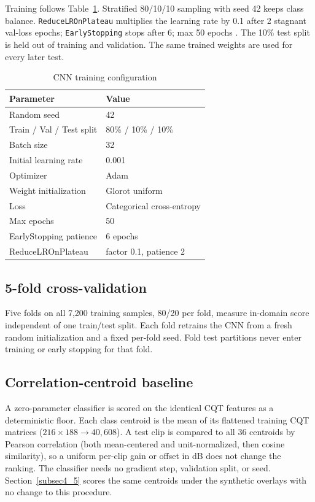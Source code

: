 \documentclass[pdflatex,sn-mathphys-num,iicol]{sn-jnl}
\theoremstyle{thmstyleone}
\theoremstyle{thmstyletwo}
\theoremstyle{thmstylethree}
\begin{document}
Training follows Table~\ref{tab:cnn-training-config}. Stratified 80/10/10 sampling with seed 42 keeps class balance. \texttt{ReduceLROnPlateau} multiplies the learning rate by 0.1 after 2 stagnant val-loss epochs; \texttt{EarlyStopping} stops after 6; max 50 epochs \cite{Wolf-Monheim2025}. The 10\% test split is held out of training and validation. The same trained weights are used for every later test.

\begin{table}[t]
\caption{CNN training configuration}\label{tab:cnn-training-config}
\begin{tabular}{@{}ll@{}}
\toprule
Parameter & Value \\
\midrule
Random seed & 42 \\
Train / Val / Test split & 80\% / 10\% / 10\% \\
Batch size & 32 \\
Initial learning rate & 0.001 \\
Optimizer & Adam \\
Weight initialization & Glorot uniform \\
Loss & Categorical cross-entropy \\
Max epochs & 50 \\
EarlyStopping patience & 6 epochs \\
ReduceLROnPlateau & factor 0.1, patience 2 \\
\bottomrule
\end{tabular}
\end{table}

\subsection{5-fold cross-validation}\label{subsec3_5}

Five folds on all 7{,}200 training samples, 80/20 per fold, measure in-domain score independent of one train/test split. Each fold retrains the CNN from a fresh random initialization and a fixed per-fold seed. Fold test partitions never enter training or early stopping for that fold.

\subsection{Correlation-centroid baseline}\label{subsec3_baseline}

A zero-parameter classifier is scored on the identical CQT features as a deterministic floor. Each class centroid is the mean of its flattened training CQT matrices ($216\times188 \to 40{,}608$). A test clip is compared to all 36 centroids by Pearson correlation (both mean-centered and unit-normalized, then cosine similarity), so a uniform per-clip gain or offset in dB does not change the ranking. The classifier needs no gradient step, validation split, or seed. Section~\ref{subsec4_5} scores the same centroids under the synthetic overlays with no change to this procedure.
\end{document}
